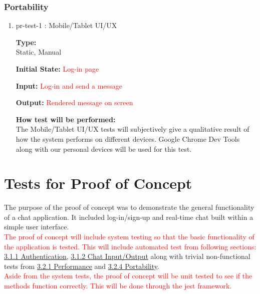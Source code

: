 \documentclass[12pt, titlepage]{article}
\begin{document}
\subsubsection{Portability}
\label{sec:port}
\begin{enumerate}
\item{pr-test-1 : Mobile/Tablet UI/UX\\}

\textbf{Type:}\\ Static, Manual
					
\textbf{Initial State:}  \textcolor{red}{Log-in page}
					
\textbf{Input:} \textcolor{red}{Log-in and send a message}
					
\textbf{Output:} \textcolor{red}{Rendered message on screen}
					
\textbf{How test will be performed:}\\ 
The Mobile/Tablet UI/UX tests will subjectively give a qualitative result of how the system performs on different devices. Google Chrome Dev Tools along with our personal devices will be used for this test.
\end{enumerate}


\section{Tests for Proof of Concept}

The purpose of the proof of concept was to demonstrate the general functionality of a chat application. It included log-in/sign-up and real-time chat built within a simple user interface.\\
\textcolor{red}{The proof of concept will include system testing so that the basic functionality of the application is tested. This will include automated test from following sections:}\\
\hyperref[sec:auth]{3.1.1 Authentication}, \hyperref[sec:frontendtests]{3.1.2 Chat Input/Output} along with trivial non-functional tests from \hyperref[sec:perf]{3.2.1 Performance} and \hyperref[sec:port]{3.2.4 Portability}.\\
\textcolor{red}{Aside from the system tests, the proof of concept will be unit tested to see if the methods function correctly. This will be done through the jest framework.}


	
\end{document}
